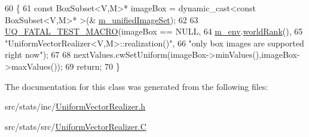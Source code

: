 \begin{DoxyCode}
60 \{
61   \textcolor{keyword}{const} BoxSubset<V,M>* imageBox = \textcolor{keyword}{dynamic\_cast<}\textcolor{keyword}{const }BoxSubset<V,M>* \textcolor{keyword}{>}(&
      \hyperlink{class_q_u_e_s_o_1_1_base_vector_realizer_a6c705235d28a3c12641da57cde948872}{m\_unifiedImageSet});
62 
63   \hyperlink{_defines_8h_a56d63d18d0a6d45757de47fcc06f574d}{UQ\_FATAL\_TEST\_MACRO}(imageBox == NULL,
64                       \hyperlink{class_q_u_e_s_o_1_1_base_vector_realizer_acde246c52f82d8ed687d91cfac14c29c}{m\_env}.\hyperlink{class_q_u_e_s_o_1_1_base_environment_a78b57112bbd0e6dd0e8afec00b40ffa7}{worldRank}(),
65                       \textcolor{stringliteral}{"UniformVectorRealizer<V,M>::realization()"},
66                       \textcolor{stringliteral}{"only box images are supported right now"});
67   
68   nextValues.cwSetUniform(imageBox->minValues(),imageBox->maxValues());
69   \textcolor{keywordflow}{return};
70 \}
\end{DoxyCode}


The documentation for this class was generated from the following files\-:\begin{DoxyCompactItemize}
\item 
src/stats/inc/\hyperlink{_uniform_vector_realizer_8h}{Uniform\-Vector\-Realizer.\-h}\item 
src/stats/src/\hyperlink{_uniform_vector_realizer_8_c}{Uniform\-Vector\-Realizer.\-C}\end{DoxyCompactItemize}
